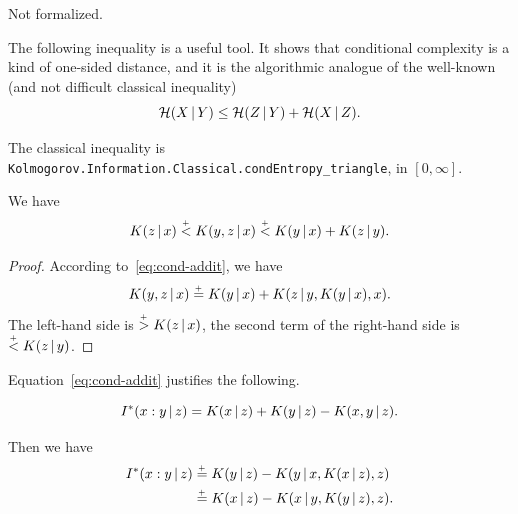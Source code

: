\begin{formalization}
Not formalized.
\end{formalization}

The following inequality is a useful tool.
It shows that conditional complexity is a kind of one-sided distance, and
it is the algorithmic analogue of the well-known (and not difficult
classical inequality)
 \[
   \mathcal{H}(X \,\vert\, Y) \le \mathcal{H}(Z \,\vert\, Y) + \mathcal{H}(X \,\vert\, Z).
 \]

\begin{formalization}
The classical inequality is
\texttt{Kolmogorov.Information.Classical.condEntropy\_triangle}, in \( [0, \infty] \).
\end{formalization}

 \begin{theorem}\label{thm:simple-triangle}
  \leanok
We have
 \begin{equation}\label{eq:simple-triangle}
  K(z \,\vert\, x) \stackrel{{}_+}{<} K(y, z \,\vert\, x) \stackrel{{}_+}{<} K(y \,\vert\, x) + K(z \,\vert\, y).
 \end{equation}
 \end{theorem}

 \begin{proof}
  \leanok
  According to~\eqref{eq:cond-addit}, we have
\[
  K(y, z \,\vert\, x) \stackrel{{}_+}{=} K(y \,\vert\, x) + K(z \,\vert\, y, K(y \,\vert\, x), x).
\]
The left-hand side is \( \stackrel{{}_+}{>} K(z \,\vert\, x) \), the second term of the
right-hand side is \( \stackrel{{}_+}{<} K(z \,\vert\, y) \).
 \end{proof}

Equation~\eqref{eq:cond-addit} justifies the following.
 \begin{definition}
  \label{def:g3.1.14}
  \leanok
 \begin{equation}\label{eq:cond-inf}
 I^{*}(x : y \,\vert\, z) = K(x \,\vert\, z) + K(y \,\vert\, z) - K(x, y \,\vert\, z).
 \end{equation}
 \end{definition}

Then we have
 \begin{align*}
    I^{*}(x : y \,\vert\, z) &\stackrel{{}_+}{=} K(y \,\vert\, z) - K(y \,\vert\, x, K(x \,\vert\, z), z)
\\                      &\stackrel{{}_+}{=} K(x \,\vert\, z) - K(x \,\vert\, y, K(y \,\vert\, z), z).
 \end{align*}

